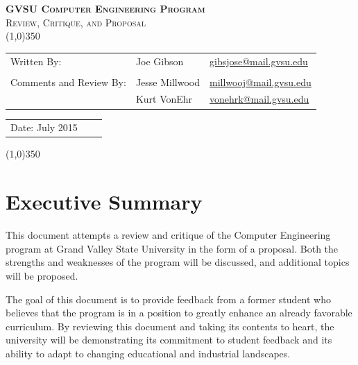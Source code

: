 \documentclass[12pt]{article}
\newcommand{\ASSNMT}{GVSU Computer Engineering Program}
\newcommand{\CLASS}{Review, Critique, and Proposal}
\newcommand{\DATE}{July 2015}
\numberwithin{figure}{section}
\numberwithin{equation}{section}
\begin{document}
\begin{flushleft}

\textsc{\LARGE \bfseries \ASSNMT}\\

\textsc{\Large \CLASS}\\[0.2cm]
\linethickness{0.5mm}
{\color{NavyBlue}\line(1,0){350}} \\ [1.0cm]

\begin{flushleft} \large
\begin{tabular}{lll}
Written By: & Joe Gibson    & \href{mailto:gibsjose@mail.gvsu.edu}{gibsjose@mail.gvsu.edu}\\
              &               & \\
Comments and Review By: & Jesse Millwood  &       \href{mailto:millwooj@mail.gvsu.edu}{millwooj@mail.gvsu.edu}\\
        & Kurt VonEhr     & \href{mailto:vonehrk@mail.gvsu.edu}{vonehrk@mail.gvsu.edu}\\
\end{tabular}

\bigskip

\bigskip

\begin{tabular}{lll}
Date: \DATE
\end{tabular}
\end{flushleft}

\smallskip
{\color{NavyBlue}\line(1,0){350}} \\ [1.0cm]
\section*{Executive Summary} \label{sect:execsum}
This document attempts a review and critique of the Computer Engineering program at Grand Valley State University in the form of a proposal. Both the strengths and weaknesses of the program will be discussed, and additional topics will be proposed.

\bigskip

The goal of this document is to provide feedback from a former student who believes that the program is in a position to greatly enhance an already favorable curriculum. By reviewing this document and taking its contents to heart, the university will be demonstrating its commitment to student feedback and its ability to adapt to changing educational and industrial landscapes.


\end{flushleft}
\end{document}
